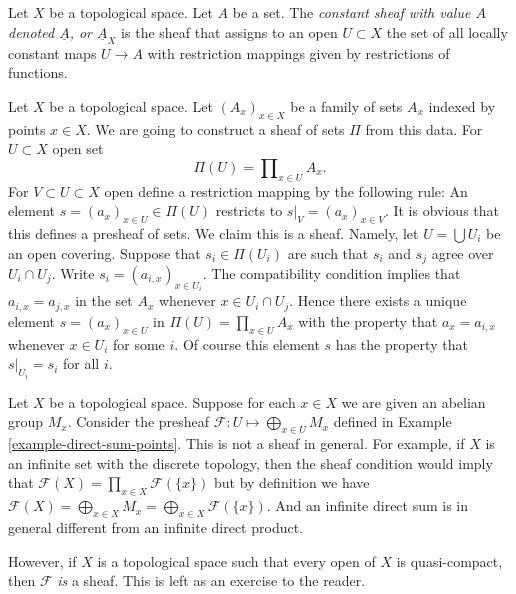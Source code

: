 \begin{definition}
\label{definition-constant-sheaf}
Let $X$ be a topological space. Let $A$ be a set.
The {\it constant sheaf with value $A$ denoted $\underline{A}$, or
$\underline{A}_X$} is the sheaf that assigns to an open $U \subset X$
the set of all locally constant maps $U \to A$ with restriction mappings
given by restrictions of functions.
\end{definition}

\begin{example}
\label{example-sheaf-product-pointwise}
Let $X$ be a topological space. Let $(A_x)_{x \in X}$ be
a family of sets $A_x$ indexed by points $x \in X$. We are
going to construct a sheaf of sets $\Pi$ from this data.
For $U \subset X$ open set
$$
\Pi(U) = \prod\nolimits_{x \in U} A_x.
$$
For $V \subset U \subset X$ open define
a restriction mapping by the following rule: An element
$s = (a_x)_{x\in U} \in \Pi(U)$ restricts
to $s|_V = (a_x)_{x \in V}$. It is obvious that this
defines a presheaf of sets. We claim this is a sheaf.
Namely, let $U = \bigcup U_i$ be an open covering.
Suppose that $s_i \in \Pi(U_i)$ are
such that $s_i$ and $s_j$ agree over $U_i \cap U_j$. Write
$s_i = (a_{i, x})_{x\in U_i}$. The compatibility condition implies that
$a_{i, x} = a_{j, x}$ in the set $A_x$ whenever $x \in U_i \cap U_j$.
Hence there exists a unique element $s = (a_x)_{x\in U}$
in $\Pi(U) = \prod_{x\in U} A_x$ with the property that
$a_x = a_{i, x}$ whenever $x \in U_i$ for some $i$. Of course this
element $s$ has the property that $s|_{U_i} = s_i$ for all $i$.
\end{example}

\begin{example}
\label{example-direct-sum-points-not-sheaf}
Let $X$ be a topological space.
Suppose for each $x\in X$ we are given an abelian group $M_x$.
Consider the presheaf $\mathcal{F} : U \mapsto \bigoplus_{x \in U} M_x$
defined in Example \ref{example-direct-sum-points}. This
is not a sheaf in general. For example, if $X$ is an infinite set
with the discrete topology, then the sheaf condition
would imply that $\mathcal{F}(X) = \prod_{x\in X} \mathcal{F}(\{x\})$
but by definition we have $\mathcal{F}(X)
= \bigoplus_{x \in X} M_x = \bigoplus_{x \in X} \mathcal{F}(\{x\})$.
And an infinite direct sum is in general different from an infinite
direct product.

\medskip\noindent
However, if $X$ is a topological space such that every open
of $X$ is quasi-compact, then $\mathcal{F}$ {\it is} a sheaf.
This is left as an exercise to the reader.
\end{example}



